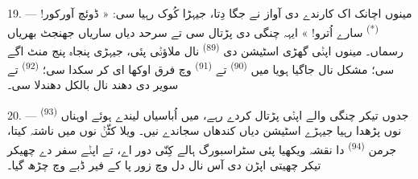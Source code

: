 \VUsaut{3.0mm}
\VUsaut{3.0mm}

19. --- مینوں اچانک اک کارندے دی آواز نے جگا دِتا، جیہڑا کُوک رہیا سی:
« ڈوئچ آورکور! \textsuperscript{(*)} سارے اُترو! » ایہہ چنگی دی پڑتال سی تے سرحد
دیاں ساریاں جھنجٹ بھریاں رسماں۔ مینوں اپݨی گھڑی اسٹیشن دی 
\textsuperscript{(89)} نال ملاؤݨی پئی، جیہڑی پنجاہ پنج منٹ اگے سی؛ مشکل نال جاگیا
ہویا میں  \textsuperscript{(90)} تے 
\textsuperscript{(91)} وچ فرق اوکھا ای کر سکدا سی؛  \textsuperscript{(92)}
تے سویر دی دھند نال بالکل دھندلا سی۔

20. --- جدوں تیکر چنگی والے اپݨی پڑتال کردے رہے، میں اُباسیاں لیندے ہوئے اوہناں
 \textsuperscript{(93)} نوں پڑھدا رہیا جیہڑے اسٹیشن دیاں کندھاں
سجاندے نیں۔ ویلا کٹّݨ نوں میں ناشتہ کیتا، جرمن  \textsuperscript{(94)}
دا نقشہ ویکھیا پئی سٹراسبورگ ہالے کِنّی دور اے، تے اپݨے سفر دے چھیکر تیکر چھیتی
اپڑن دی آس نال دل وچ زور پا کے فیر ڈبے وچ چڑھ گیا۔
\VUsaut{6.0mm}
\VUfilet{22mm}
